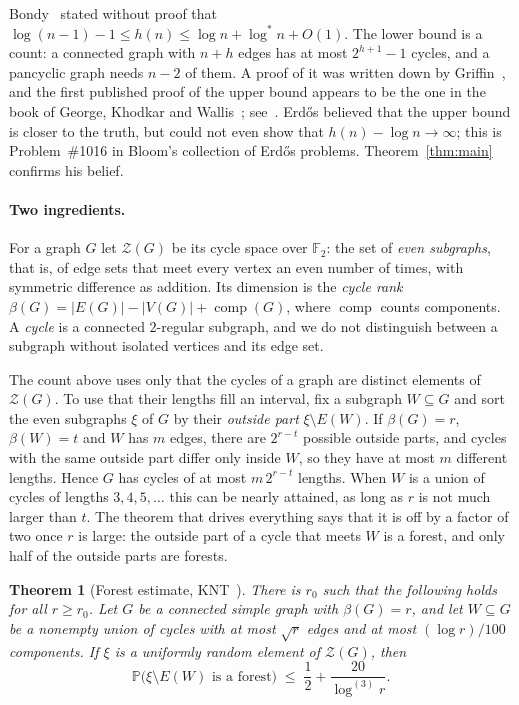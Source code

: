 \documentclass[11pt]{article}
\newtheorem{theorem}{Theorem}[section]
\theoremstyle{definition}
\theoremstyle{remark}
\newcommand{\Z}{\mathcal{Z}}
\newcommand{\PP}{\mathbb{P}}
\newcommand{\comp}{\operatorname{comp}}
\newcommand{\lgs}{\log^{*}}
\newcommand{\lgk}[1]{\log^{(#1)}}
\newcommand{\sm}{\setminus}
\begin{document}
Bondy~\cite{Bondy} stated without proof that $\log(n-1)-1\le h(n)\le\log n+\lgs n+O(1)$. The lower
bound is a count: a connected graph with $n+h$ edges has at most $2^{h+1}-1$ cycles, and a pancyclic
graph needs $n-2$ of them. A proof of it was written down by Griffin~\cite{Griffin}, and the first
published proof of the upper bound appears to be the one in the book of George, Khodkar and
Wallis~\cite[\S4.5]{GKW}; see~\cite{Bloom}. Erd\H{o}s believed that the upper bound is closer to the truth, but could
not even show that $h(n)-\log n\to\infty$; this is Problem~\#1016 in Bloom's collection of Erd\H{o}s problems.
Theorem~\ref{thm:main} confirms his belief.

\paragraph{Two ingredients.}
For a graph $G$ let $\Z(G)$ be its cycle space over $\mathbb{F}_2$: the set of \emph{even subgraphs},
that is, of edge sets that meet every vertex an even number of times, with symmetric difference as
addition. Its dimension is the \emph{cycle rank} $\beta(G)=|E(G)|-|V(G)|+\comp(G)$, where $\comp$
counts components. A \emph{cycle} is a connected $2$-regular subgraph, and we do not distinguish
between a subgraph without isolated vertices and its edge set.

The count above uses only that the cycles of a graph are distinct elements of $\Z(G)$. To use that
their lengths fill an interval, fix a subgraph $W\subseteq G$ and sort the even subgraphs $\xi$ of $G$
by their \emph{outside part} $\xi\sm E(W)$. If $\beta(G)=r$, $\beta(W)=t$ and $W$ has $m$ edges, there
are $2^{r-t}$ possible outside parts, and cycles with the same outside part differ only inside $W$, so
they have at most $m$ different lengths. Hence $G$ has cycles of at most $m\,2^{r-t}$ lengths. When
$W$ is a union of cycles of lengths $3,4,5,\dots$ this can be nearly attained, as long as $r$ is not
much larger than $t$. The theorem that drives everything says that it is off by a factor of two once
$r$ is large: the outside part of a cycle that meets $W$ is a forest, and only half of the outside
parts are forests.

\begin{theorem}[Forest estimate, KNT~\cite{KNT}]\label{thm:forest}
There is $r_0$ such that the following holds for all $r\ge r_0$. Let $G$ be a connected simple graph
with $\beta(G)=r$, and let $W\subseteq G$ be a nonempty union of cycles with at most $\sqrt r$ edges
and at most $(\log r)/100$ components. If $\xi$ is a uniformly random element of $\Z(G)$, then
\begin{equation}\label{eq:forest}
  \PP\bigl(\xi\sm E(W)\text{ is a forest}\bigr)\;\le\;\frac12+\frac{20}{\lgk{3}r}.
\end{equation}
\end{theorem}
\end{document}

